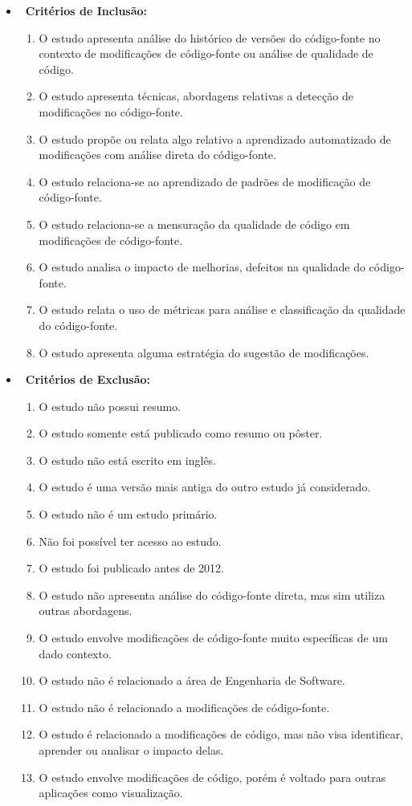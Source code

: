 \begin{itemize}
\item~\textbf{Critérios de Inclusão:}
\begin{enumerate}
\item O estudo apresenta análise do histórico de versões do código-fonte no contexto de modificações de código-fonte ou análise de qualidade de código.
\item O estudo apresenta técnicas, abordagens relativas a detecção de modificações no código-fonte. 
\item O estudo propõe ou relata algo relativo a aprendizado automatizado de modificações com análise direta do código-fonte.
\item O estudo relaciona-se ao aprendizado de padrões de modificação de código-fonte.
\item O estudo relaciona-se a mensuração da qualidade de código em modificações de código-fonte.
\item O estudo analisa o impacto de melhorias, defeitos na qualidade do código-fonte.
\item O estudo relata o uso de métricas para análise e classificação da qualidade do código-fonte.
\item O estudo apresenta alguma estratégia do sugestão de modificações.
\end{enumerate}
\item~\textbf{Critérios de Exclusão:}
\begin{enumerate}
\item O estudo não possui resumo.
\item O estudo somente está publicado como resumo ou pôster.
\item O estudo não está escrito em inglês.
\item O estudo é uma versão mais antiga do outro estudo já considerado.
\item O estudo não é um estudo primário.
\item Não foi possível ter acesso ao estudo.
\item O estudo foi publicado antes de 2012.
\item O estudo não apresenta análise do código-fonte direta, mas sim utiliza outras abordagens.
\item O estudo envolve modificações de código-fonte muito específicas de um dado contexto.
\item O estudo não é relacionado a área de Engenharia de Software.
\item O estudo não é relacionado a modificações de código-fonte.
\item O estudo é relacionado a modificações de código, mas não visa identificar, aprender ou analisar o impacto delas.
\item O estudo envolve modificações de código, porém é voltado para outras aplicações como visualização.
\end{enumerate}
\end{itemize}

